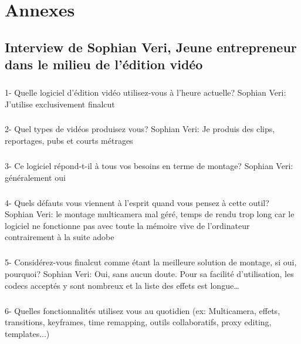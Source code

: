 \newpage

\chapter{Annexes}
\section{Interview de Sophian Veri,
Jeune entrepreneur dans le milieu de l'édition vidéo}

\paragraph{}
1-  Quelle logiciel d'édition vidéo utilisez-vous à l'heure actuelle?
Sophian Veri: J'utilise exclusivement finalcut

\paragraph{}
2- Quel types de vidéos produisez vous?
Sophian Veri: Je produis des clips, reportages, pubs et courts métrages

\paragraph{}
3- Ce logiciel répond-t-il à tous vos besoins en terme de montage?
Sophian Veri: généralement oui

\paragraph{}
4- Quels défauts vous viennent à l'esprit quand vous pensez à cette outil?
Sophian Veri: le montage multicamera mal géré, temps de rendu trop long car le
logiciel ne fonctionne pas avec toute la mémoire vive de l'ordinateur
contrairement à la suite adobe

\paragraph{}
5- Considérez-vous finalcut comme étant la meilleure solution de montage,
si oui, pourquoi?
Sophian Veri: Oui, sans aucun doute. Pour sa facilité d'utilisation,
les codecs acceptés y sont nombreux et la liste des effets est
longue\ldots

\paragraph{}
6-  Quelles fonctionnalités utilisez vous au quotidien (ex: Multicamera, effets,
transitions, keyframes, time remapping, outils collaboratifs, proxy
editing, templates...)

